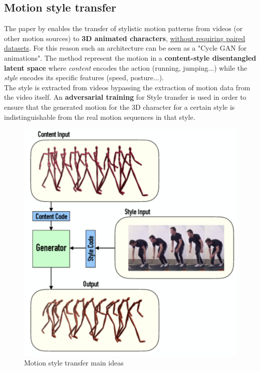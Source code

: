 \subsection{Motion style transfer}
The paper  by \citeauthor{aberman2020unpaired} enables the transfer of stylistic motion patterns from videos (or other motion sources) to \textbf{3D animated characters}, \underline{without requiring paired datasets}. For this reason such an architecture can be seen as a "Cycle GAN for animations". The method represent the motion in a \textbf{content-style disentangled latent space} where \textit{content} encodes the action (running, jumping...) while the \textit{style} encodes its specific features (speed, posture...).\\
The style is extracted from videos bypassing the extraction of motion data from the video itself. An \textbf{adversarial training} for Style transfer is used in order to ensure that the generated motion for the 3D character for a certain style is indistinguishable from the real motion sequences in that style.

\begin{figure}
    \centering
    \includegraphics[scale=0.8]{img/MotionStyleTransfer.png}
    \caption{Motion style transfer main ideas}
\end{figure}


